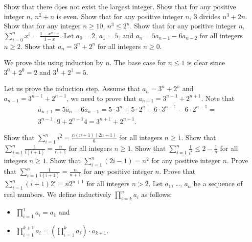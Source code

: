 \begin{chapterendexercises}
    \exercise Show that there does not exist the largest integer.
    \exercise[recommended] Show that for any positive integer $n$, $n^2 + n$ is even.
    \exercise Show that for any positive integer $n$, $3$ divides
        $n^3 + 2n$.
    \exercise Show that for any integer $n \ge 10$,
        $n^3 \le 2^n$.
    \exercise Show that for any positive integer $n$,
        $\sum_{i = 0}^n x^i = \frac{1 - x^{n + 1}}{1 - x}$.
    \exercise Let $a_0 = 2$, $a_1 = 5$, and $a_n = 5a_{n - 1} - 6 a_{n - 2}$
        for all integers $n \ge 2$. Show that $a_n = 3^n + 2^n$ for all integers
        $n \ge 0$.
        \begin{solution}
            We prove this using induction by $n$. The base case for $n \le 1$ is clear
            since $3^0 + 2^0 = 2$ and $3^1 + 2^1 = 5$.

            Let us prove the induction step. Assume that $a_n = 3^n + 2^n$ and
            $a_{n - 1} = 3^{n - 1} + 2^{n - 1}$, we need to prove that
            $a_{n + 1} = 3^{n + 1} + 2^{n + 1}$. Note that
            \begin{multline*}
                a_{n + 1} = 5a_n - 6 a_{n - 1} =
                5 \cdot 3^n + 5 \cdot 2^n - 6 \cdot 3^{n - 1} -
                6 \cdot 2^{n - 1} = \\
                3^{n - 1} \cdot 9 + 2^{n - 1} 4 = 3^{n + 1} + 2^{n + 1}.
            \end{multline*}
        \end{solution}
    \exercise[recommended] Show that $\sum_{i = 1}^n i^2 =
        \frac{n (n + 1)(2n + 1)}{6}$ for all integers $n \ge 1$.
    \exercise Show that $\sum_{i = 1}^n \frac{1}{i (i + 1)} =
        \frac{n}{n + 1}$ for all integers $n \ge 1$.
    \exercise Show that $\sum_{i = 1}^n \frac{1}{i^2} \le
        2 - \frac{1}{n}$ for all integers $n \ge 1$.
    \exercise Show that $\sum_{i = 1}^n (2i - 1) = n^2$ for any positive
        integer $n$.
    \exercise Prove that $\sum_{i = 1}^n \frac{1}{i (i + 1)} =
        \frac{n}{n + 1}$ for any positive integer $n$.
    \exercise Prove that $\sum_{i = 1}^n (i + 1) 2^i = n 2^{n + 1}$
        for all integers $n > 2$.
    \exercise Let $a_1$, \dots, $a_n$ be a sequence of real numbers.
        We define inductively
        $\prod_{i = k}^n a_i$ as follows:
        \begin{itemize}
            \item $\prod_{i = 1}^1 a_i = a_1$ and
            \item $\prod_{i = 1}^{k + 1} a_i =
                \left( \prod_{i = 1}^k a_i \right) \cdot a_{k + 1}$.
        \end{itemize}


\end{chapterendexercises}
